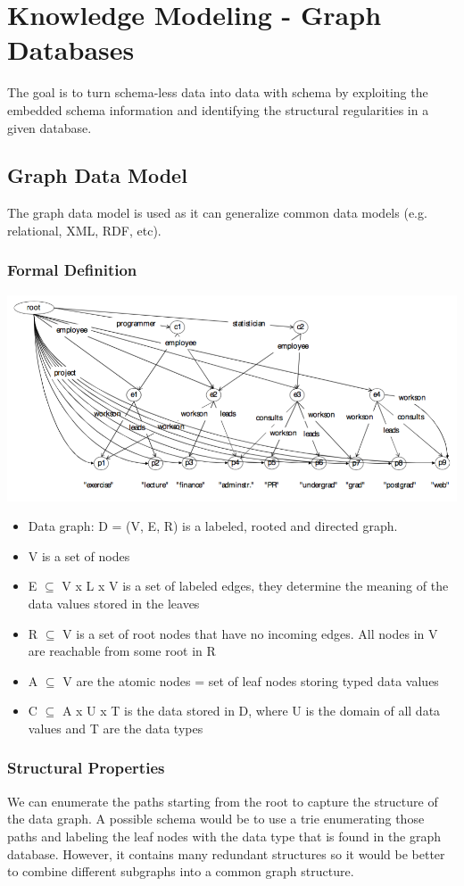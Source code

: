 
\section{Knowledge Modeling - Graph Databases}
The goal is to turn schema-less data into data with schema by exploiting the embedded schema information and identifying the structural regularities in a given database. 

\subsection{Graph Data Model}
The graph data model is used as it can generalize common data models (e.g. relational, XML, RDF, etc).
\subsubsection{Formal Definition} 
\includegraphics[width=\textwidth]{figures/data_graph.png}
\begin{itemize}
  \item Data graph: D = (V, E, R) is a labeled, rooted and directed graph. 
  \item V is a set of nodes
  \item E $\subseteq$ V x L x V is a set of labeled edges, they determine the meaning of the data values stored in the leaves
  \item R $\subseteq$ V is a set of root nodes that have no incoming edges. All nodes in V are reachable from some root in R
  \item A $\subseteq$ V are the atomic nodes = set of leaf nodes storing typed data values
  \item C $\subseteq$ A x U x T is the data stored in D, where U is the domain of all data values and T are the data types
\end{itemize}

\subsubsection{Structural Properties}
We can enumerate the paths starting from the root to capture the structure of the data graph. A possible schema would be to use a trie enumerating those paths and labeling the leaf nodes with the data type that is found in the graph database. However, it contains many redundant structures so it would be better to combine different subgraphs into a common graph structure. 

